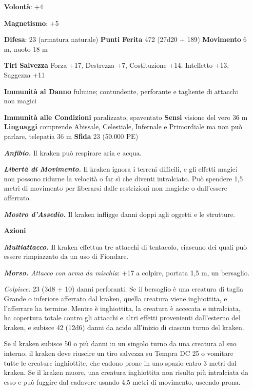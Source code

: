 \begin{multicols}{2}
\textbf{Volontà}: +4

\textbf{Magnetismo}: +5

\textbf{Difesa}: 23 (armatura naturale) \textbf{Punti Ferita}
472 (27d20 + 189) \textbf{Movimento} 6 m, nuoto 18 m

\textbf{Tiri Salvezza} Forza +17, Destrezza +7, Costituzione +14,
Intelletto +13, Saggezza +11

\textbf{Immunità al Danno} fulmine; contundente, perforante e tagliente
di attacchi non magici

\textbf{Immunità alle Condizioni} paralizzato, spaventato \textbf{Sensi}
visione del vero 36 m \textbf{Linguaggi}
comprende Abissale, Celestiale, Infernale e Primordiale ma non può
parlare, telepatia 36 m \textbf{Sfida} 23 (50.000 PE)

\emph{\textbf{Anfibio.}} Il kraken può respirare aria e acqua.

\emph{\textbf{Libertà di Movimento.}} Il kraken ignora i terreni
difficili, e gli effetti magici non possono ridurne la velocità o far sì
che diventi intralciato. Può spendere 1,5 metri di movimento per
liberarsi dalle restrizioni non magiche o dall'essere afferrato.

\emph{\textbf{Mostro d'Assedio.}} Il kraken infligge danni doppi agli
oggetti e le strutture.

\textbf{Azioni}

\emph{\textbf{Multiattacco.}} Il kraken effettua tre attacchi di
tentacolo, ciascuno dei quali può essere rimpiazzato da un uso di
Fiondare.

\emph{\textbf{Morso.} Attacco con arma da mischia}: +17 a colpire,
portata 1,5 m, un bersaglio.

\emph{Colpisce:} 23 (3d8 + 10) danni perforanti. Se il bersaglio è una
creatura di taglia Grande o inferiore afferrato dal kraken, quella
creatura viene inghiottita, e l'afferrare ha termine. Mentre è
inghiottita, la creatura è accecata e intralciata, ha copertura totale
contro gli attacchi e altri effetti provenienti dall'esterno del kraken,
e subisce 42 (12d6) danni da acido all'inizio di ciascun turno del
kraken.

Se il kraken subisce 50 o più danni in un singolo turno da una creatura
al suo interno, il kraken deve riuscire un tiro salvezza su Tempra
DC 25 o vomitare tutte le creature inghiottite, che cadono prone in uno
spazio entro 3 metri dal kraken. Se il kraken muore, una creatura
inghiottita non risulta più intralciata da esso e può fuggire dal
cadavere usando 4,5 metri di movimento, uscendo prona.


\end{multicols}

